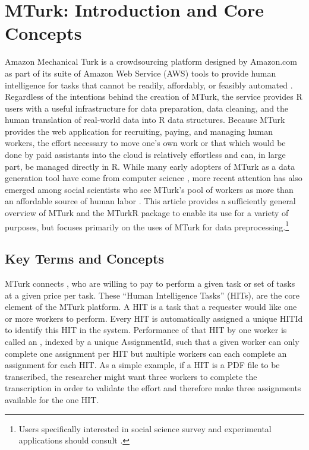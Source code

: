 \section{MTurk: Introduction and Core Concepts}
Amazon Mechanical Turk is a crowdsourcing platform designed by Amazon.com as part of its suite of Amazon Web Service (AWS) tools to provide human intelligence for tasks that cannot be readily, affordably, or feasibly automated \citep{Amazon2012}. Regardless of the intentions behind the creation of MTurk, the service provides R users with a useful infrastructure for data preparation, data cleaning, and the human translation of real-world data into R data structures. Because MTurk provides the web application for recruiting, paying, and managing human workers, the effort necessary to move one's own work or that which would be done by paid assistants into the cloud is relatively effortless and can, in large part, be managed directly in R. While many early adopters of MTurk as a data generation tool have come from computer science \citep{MasonSuri2011, KitturChiSuh2008}, more recent attention has also emerged among social scientists who see MTurk's pool of workers as more than an affordable source of human labor \citep{BuhrmesterKwangGosling2011, BerinskyHuberLenz2010, PaolacciChandlerStern2010}. This article provides a sufficiently general overview of MTurk and the MTurkR package to enable its use for a variety of purposes, but focuses primarily on the uses of MTurk for data preprocessing.\footnote{Users specifically interested in social science survey and experimental applications should consult \citet{Leeper2013a}.}

\subsection{Key Terms and Concepts}
MTurk connects , who are willing to pay  to perform a given task or set of tasks at a given price per task. These ``Human Intelligence Tasks'' (HITs), are the core element of the MTurk platform. A HIT is a task that a requester would like one or more workers to perform. Every HIT is automatically assigned a unique HITId to identify this HIT in the system. Performance of that HIT by one worker is called an , indexed by a unique AssignmentId, such that a given worker can only complete one assignment per HIT but multiple workers can each complete an assignment for each HIT. As a simple example, if a HIT is a PDF file to be transcribed, the researcher might want three workers to complete the transcription in order to validate the effort and therefore make three assignments available for the one HIT.

